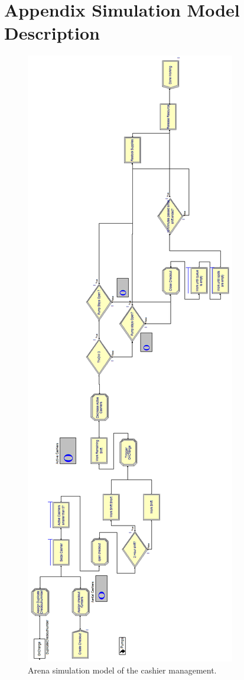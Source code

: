 \section{Appendix Simulation Model Description}\label{app:modeldescription}
\begin{figure}[H!]
	\includegraphics[scale=0.3]{images/model-description/model-cashier-management.PNG}
	\caption{Arena simulation model of the cashier management.}
	\label{fig:model-cashier}
\end{figure}